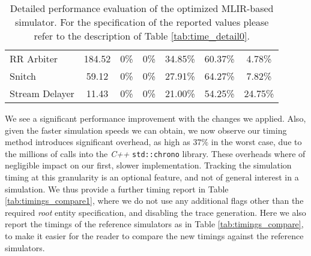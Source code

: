 \begin{table}[ht]
{\begin{tabular}{lcccccc}
      RR Arbiter      & 184.52             & 0\%                        & 0\%                        & 34.85\%                    & 60.37\%                    & 4.78\%             \\
      Snitch          & 59.12              & 0\%                        & 0\%                        & 27.91\%                    & 64.27\%                    & 7.82\%             \\
      Stream Delayer  & 11.43              & 0\%                        & 0\%                        & 21.00\%                    & 54.25\%                    & 24.75\%            \\
      \bottomrule
    \end{tabular}
  }
  \caption[Detailed performance evaluation of the optimized MLIR-based simulator.]{Detailed performance evaluation of the optimized MLIR-based simulator. For the specification of the reported values please refer to the description of Table \ref{tab:time_detail0}.}
  \label{tab:time_detail1}
\end{table}

We see a significant performance improvement with the changes we applied. Also, given the faster simulation speeds we can obtain, we now observe our timing method introduces significant overhead, as high as $37\%$ in the worst case, due to the millions of calls into the \textit{C++} \texttt{std::chrono} library. These overheads where of negligible impact on our first, slower implementation. Tracking the simulation timing at this granularity is an optional feature, and not of general interest in a simulation. We thus provide a further timing report in Table \ref{tab:timings_compare1}, where we do not use any additional flags other than the required \textit{root} entity specification, and disabling the trace generation. Here we also report the timings of the reference simulators as in Table \ref{tab:timings_compare}, to make it easier for the reader to compare the new timings against the reference simulators.

